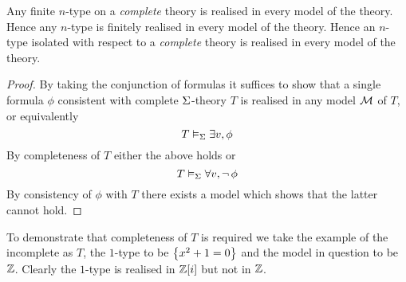 \begin{prop}
    Any finite $n$-type on a 
    \textit{complete} theory
    is realised in every model of the theory.
    Hence any $n$-type is finitely realised in every model of the theory.
    Hence an $n$-type isolated with respect to a \textit{complete} 
    theory is realised in every model of the theory.
\end{prop}
\begin{proof}
    By taking the conjunction of formulas 
    it suffices to show that a single formula $\phi$ consistent with complete
    $\Sigma$-theory $T$ is realised in any model $\mathcal{M}$ of $T$, or equivalently
    \[T \vDash_{\Sigma} \exists v, \phi\]
    By completeness of $T$ either the above holds or 
    \[T \vDash_{\Sigma} \forall v, \neg\, \phi\]
    By consistency of $\phi$ with $T$ there exists a 
    model which shows that the latter cannot hold.
\end{proof}
\begin{rmk}
    To demonstrate that completeness of $T$ is required we take the example 
    of the incomplete  as $T$, 
    the $1$-type to be $\left\{x^2 + 1 = 0\right\}$ and the model in question to be $\mathbb{Z}$.
    Clearly the $1$-type is realised in $\mathbb{Z}[i]$ but not in $\mathbb{Z}$.
\end{rmk}

